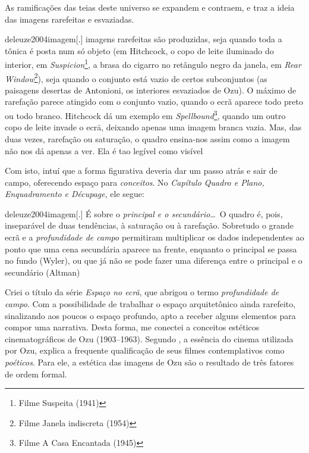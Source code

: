 As ramificações das teias deste universo se expandem e contraem, e
\textcite{deleuze2004imagem} traz a ideia das imagens rarefeitas e
esvaziadas.

\begin{displaycquote}[22-23]{deleuze2004imagem}[.]
	\textelp{} imagens rarefeitas são produzidas, seja quando toda a tônica é
	posta num só objeto (em Hitchcock, o copo de leite iluminado do
	interior, em \emph{Suspicion}\footnote{Filme Suspeita (1941)}, a brasa
	do cigarro no retângulo negro da janela, em \emph{Rear
		Window}\footnote{Filme Janela indiscreta (1954)}), seja quando o
	conjunto está vazio de certos subconjuntos (as paisagens desertas de
	Antonioni, os interiores esvaziados de Ozu). O máximo de rarefação
	parece atingido com o conjunto vazio, quando o ecrã aparece todo preto
	ou todo branco. Hitchcock dá um exemplo em \emph{Spellbound}\footnote{Filme
		A Casa Encantada (1945)}, quando um outro copo de leite invade o ecrā,
	deixando apenas uma imagem branca vazia. Mas, das duas vezes, rarefação
	ou saturação, o quadro ensina-nos assim como a imagem não nos dá apenas
	a ver. Ela é tao legível como visível
\end{displaycquote}

Com isto, intuí que a forma figurativa deveria dar um passo atrás e
sair de campo, oferecendo espaço para \emph{conceitos}. No
\emph{Capítulo Quadro e Plano, Enquadramento e Décupage}, ele segue:

\begin{displaycquote}[25]{deleuze2004imagem}[.]
	\textelp{} É sobre o \emph{principal e o secundário}\ldots\ O quadro é, pois,
	inseparável de duas tendências, à saturação ou à rarefação. Sobretudo o
	grande ecrã e a \emph{profundidade de campo} permitiram multiplicar os
	dados independentes ao ponto que uma cena secundária aparece na frente,
	enquanto o principal se passa no fundo (Wyler), ou que já não se pode
	fazer uma diferença entre o principal e o secundário (Altman)
\end{displaycquote}

Criei o título da série \emph{Espaço no ecrã}, que abrigou o termo
\emph{profundidade de campo}. Com a possibilidade de trabalhar o espaço
arquitetônico ainda rarefeito, sinalizando aos poucos o espaço
profundo, apto a receber alguns elementos para compor uma narrativa.
Desta forma, me conectei a conceitos estéticos cinematográficos de Ozu
(1903--1963). Segundo \textcite{dias2016riso}, a essência do cinema
utilizada por Ozu, explica a frequente qualificação de seus filmes
contemplativos como \emph{poéticos}. Para ele, a estética das imagens
de Ozu são o resultado de três fatores de ordem formal.

